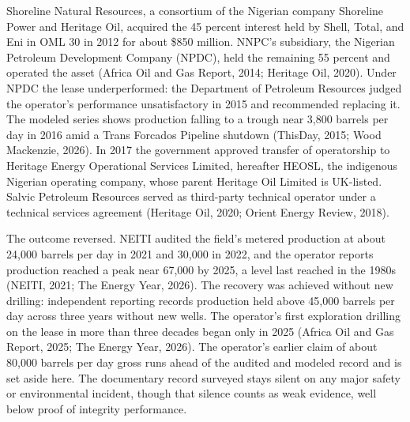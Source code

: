Shoreline Natural Resources, a consortium of the Nigerian company
Shoreline Power and Heritage Oil, acquired the 45 percent interest held
by Shell, Total, and Eni in OML 30 in 2012 for about \$850 million.
NNPC's subsidiary, the Nigerian Petroleum Development Company (NPDC),
held the remaining 55 percent and operated the asset (Africa Oil and Gas
Report, 2014; Heritage Oil, 2020). Under NPDC the lease underperformed:
the Department of Petroleum Resources judged the operator's performance
unsatisfactory in 2015 and recommended replacing it. The modeled series
shows production falling to a trough near 3,800 barrels per day in 2016
amid a Trans Forcados Pipeline shutdown (ThisDay, 2015; Wood Mackenzie,
2026). In 2017 the government approved transfer of operatorship to
Heritage Energy Operational Services Limited, hereafter HEOSL, the
indigenous Nigerian operating company, whose parent Heritage Oil Limited
is UK-listed. Salvic Petroleum Resources served as third-party technical
operator under a technical services agreement (Heritage Oil, 2020;
Orient Energy Review, 2018).

The outcome reversed. NEITI audited the field's metered production at
about 24,000 barrels per day in 2021 and 30,000 in 2022, and the
operator reports production reached a peak near 67,000 by 2025, a level
last reached in the 1980s (NEITI, 2021; The Energy Year, 2026). The
recovery was achieved without new drilling: independent reporting
records production held above 45,000 barrels per day across three years
without new wells. The operator's first exploration drilling on the
lease in more than three decades began only in 2025 (Africa Oil and Gas
Report, 2025; The Energy Year, 2026). The operator's earlier claim of
about 80,000 barrels per day gross runs ahead of the audited and modeled
record and is set aside here. The documentary record surveyed stays
silent on any major safety or environmental incident, though that
silence counts as weak evidence, well below proof of integrity
performance.

